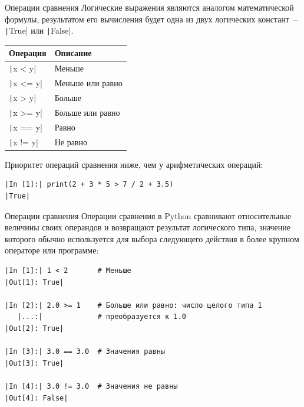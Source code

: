\documentclass[aspectratio=169]{beamer}	%
\begin{document}
\begin{frame}[fragile]{Операции сравнения}
\scriptsize
Логические выражения являются аналогом математической формулы, результатом его вычисления будет одна из двух логических констант~-- \texttt|True| или \texttt|False|.

\begin{table}[h!]
\centering
\begin{tabular}{|p{}|p{}|}
	\hline
	\textbf{Операция} & \textbf{Описание} \\
	\hline
	\texttt|x < y| & Меньше \\
	\texttt|x <= y| & Меньше или равно \\
	\texttt|x > y| & Больше \\
	\texttt|x >= y| & Больше или равно \\
	\texttt|x == y| & Равно \\
	\texttt|x != y| & Не равно \\
	\hline
\end{tabular}	
\end{table}

{\color{tpugreen}\textbullet} Приоритет операций сравнения ниже, чем у арифметических операций:

\begin{verbatim}
|In [1]:| print(2 + 3 * 5 > 7 / 2 + 3.5)
|True|
\end{verbatim}
\vfill
\end{frame}


\begin{frame}[fragile]{Операции сравнения}
\scriptsize
Операции сравнения в Python  сравнивают относительные величины своих операндов и возвращают результат логического типа, значение которого обычно используется для выбора следующего действия в более крупном операторе или программе:

\begin{verbatim}
|In [1]:| 1 < 2       # Меньше
|Out[1]: True|

|In [2]:| 2.0 >= 1    # Больше или равно: число целого типа 1 
   |...:|             # преобразуется к 1.0
|Out[2]: True|

|In [3]:| 3.0 == 3.0  # Значения равны
|Out[3]: True|

|In [4]:| 3.0 != 3.0  # Значения не равны
|Out[4]: False|
\end{verbatim}
\vfill
\end{frame}
\end{document}
